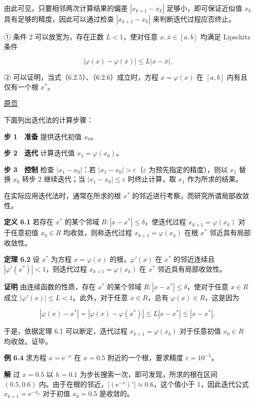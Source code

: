 \documentclass[
  10pt,
  fontset=fandol]{ctexart}
\begin{document}
由此可见，只要相邻两次计算结果的偏差 \(|x_{k+1}-x_k|\) 足够小，即可保证近似值 \(x_k\) 具有足够的精度，因此可以通过检查 \(|x_{k+1}-x_k|\) 来判断迭代过程应否终止。

① 条件 2 可以放宽为，存在正数 \(L<1\)，使对任意 \(x,\bar{x}\in[a,b]\) 均满足 Lipschitz 条件

\[
|\varphi(x)-\varphi(\bar{x})|\leqslant L|x-\bar{x}|.
\]

② 可以证明，当式（6.2.5）、（6.2.6）成立时，方程 \(x=\varphi(x)\) 在 \([a,b]\) 内有且仅有一个根 \(x^*\)。

\href{../../source-images/pdf-160.jpeg}{原页}

下面列出迭代法的计算步骤：

\textbf{步 1　准备} 提供迭代初值 \(x_0\)。

\textbf{步 2　迭代} 计算迭代值 \(x_1=\varphi(x_0)\)。

\textbf{步 3　控制} 检查 \(|x_1-x_0|\)：若 \(|x_1-x_0|>\varepsilon\)（\(\varepsilon\) 为预先指定的精度），则以 \(x_1\) 替换 \(x_0\) 转步 2 继续迭代；当 \(|x_1-x_0|\leqslant\varepsilon\) 时终止计算，取 \(x_1\) 作为所求的结果。

在实际应用迭代法时，通常在所求的根 \(x^*\) 的邻近进行考察，而研究所谓局部收敛性。

\textbf{定义 6.1} 若存在 \(x^*\) 的某个邻域 \(R:|x-x^*|\leqslant\delta\)，使迭代过程 \(x_{k+1}=\varphi(x_k)\) 对于任意初值 \(x_0\in R\) 均收敛，则称迭代过程 \(x_{k+1}=\varphi(x_k)\) 在根 \(x^*\) 邻近具有局部收敛性。

\textbf{定理 6.2} 设 \(x^*\) 为方程 \(x=\varphi(x)\) 的根，\(\varphi'(x)\) 在 \(x^*\) 的邻近连续且 \(|\varphi'(x^*)|<1\)，则迭代过程 \(x_{k+1}=\varphi(x_k)\) 在 \(x^*\) 邻近具有局部收敛性。

\textbf{证明} 由连续函数的性质，存在 \(x^*\) 的某个邻域 \(R:|x-x^*|\leqslant\delta\)，使对于任意 \(x\in R\) 成立 \(|\varphi'(x)|\leqslant L<1\)。此外，对于任意 \(x\in R\)，总有 \(\varphi(x)\in R\)，这是因为

\[
|\varphi(x)-x^*|=|\varphi(x)-\varphi(x^*)|\leqslant L|x-x^*|\leqslant|x-x^*|,
\]

于是，依据定理 6.1 可以断定，迭代过程 \(x_{k+1}=\varphi(x_k)\) 对于任意初值 \(x_0\in R\) 均收敛。证毕。

\textbf{例 6.4} 求方程 \(x=\mathrm{e}^{-x}\) 在 \(x=0.5\) 附近的一个根，要求精度 \(\varepsilon=10^{-5}\)。

\textbf{解} 过 \(x=0.5\) 以 \(h=0.1\) 为步长搜索一次，即可发现，所求的根在区间 \((0.5,0.6)\) 内。由于在根的邻近，\(|(\mathrm{e}^{-x})'|\approx0.6\)，这个值小于 1，因此迭代公式 \(x_{k+1}=\mathrm{e}^{-x_k}\) 对于初值 \(x_0=0.5\) 是收敛的。
\end{document}
